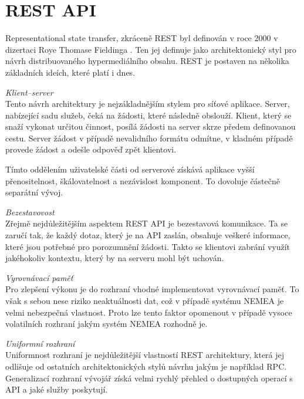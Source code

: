 \section{REST API}
\label{restapi}

Representational state transfer, zkráceně REST byl definován v roce 2000 v dizertaci Roye Thomase Fieldinga \cite{rest}. Ten jej definuje jako architektonický styl pro návrh distribuovaného hypermediálního obsahu. REST je postaven na několika základních ideích, které platí i dnes.

\begin{description}
    \item \textit{Klient--server} \\
        Tento návrh architektury je nejzákladnějším stylem pro síťové aplikace. Server, nabízející sadu služeb, čeká na žádosti, které následně obslouží. Klient, který se snaží vykonat určitou činnost, posílá žádosti na server skrze předem definovanou cestu. Server žádost v případě nevalidního formátu odmítne, v kladném případě provede žádost a odešle odpověď zpět klientovi.

        Tímto oddělením uživatelské části od serverové získává aplikace vyšší přenositelnost, škálovatelnost a nezávislost komponent. To dovoluje částečně separátní vývoj.
       
    \item \textit{Bezestavovost} \\
        Zřejmě nejdůležitějším aspektem REST API je bezestavová komunikace. Ta se zaručí tak, že každý dotaz, který je na API zaslán, obsahuje veškeré informace, které jsou potřebné pro porozumnění žádosti. Takto se klientovi zabrání využít jakéhokoliv kontextu, který by na serveru mohl být uchován.
       
    \item \textit{Vyrovnávací paměť} \\
        Pro zlepšení výkonu je do rozhraní vhodné implementovat vyrovnávací paměť. To však s sebou nese riziko neaktuálnosti dat, což v případě systému NEMEA je velmi nebezpečná vlastnost. Proto lze tento faktor opomenout v případě vysoce volatilních rozhraní jakým systém NEMEA rozhodně je.
       
    \item \textit{Uniformní rozhraní} \\
        Uniformnost rozhraní je nejdůležitější vlastností REST architektury, která jej odlišuje od ostatních architektonických stylů návrhu jakým je například RPC\cite{restful}. Generalizací rozhraní vývojář získá velmi rychlý přehled o dostupných operací s API a jaké služby poskytují.
        

\end{description}
